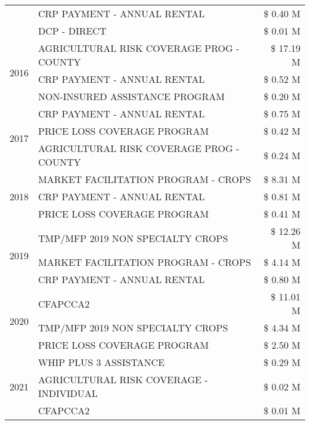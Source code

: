 \begin{tabular}{llr}
 & CRP PAYMENT - ANNUAL RENTAL & \$ 0.40 M \\
 & DCP - DIRECT & \$ 0.01 M \\
\cline{1-3}
\multirow[t]{3}{*}{2016} & AGRICULTURAL RISK COVERAGE PROG - COUNTY      & \$ 17.19 M \\
 & CRP PAYMENT - ANNUAL RENTAL                   & \$ 0.52 M \\
 & NON-INSURED ASSISTANCE PROGRAM                & \$ 0.20 M \\
\cline{1-3}
\multirow[t]{3}{*}{2017} & CRP PAYMENT - ANNUAL RENTAL & \$ 0.75 M \\
 & PRICE LOSS COVERAGE PROGRAM & \$ 0.42 M \\
 & AGRICULTURAL RISK COVERAGE PROG - COUNTY & \$ 0.24 M \\
\cline{1-3}
\multirow[t]{3}{*}{2018} & MARKET FACILITATION PROGRAM - CROPS & \$ 8.31 M \\
 & CRP PAYMENT - ANNUAL RENTAL & \$ 0.81 M \\
 & PRICE LOSS COVERAGE PROGRAM & \$ 0.41 M \\
\cline{1-3}
\multirow[t]{3}{*}{2019} & TMP/MFP 2019 NON SPECIALTY CROPS & \$ 12.26 M \\
 & MARKET FACILITATION PROGRAM - CROPS & \$ 4.14 M \\
 & CRP PAYMENT - ANNUAL RENTAL & \$ 0.80 M \\
\cline{1-3}
\multirow[t]{3}{*}{2020} & CFAPCCA2 & \$ 11.01 M \\
 & TMP/MFP 2019 NON SPECIALTY CROPS & \$ 4.34 M \\
 & PRICE LOSS COVERAGE PROGRAM & \$ 2.50 M \\
\cline{1-3}
\multirow[t]{3}{*}{2021} & WHIP PLUS 3 ASSISTANCE & \$ 0.29 M \\
 & AGRICULTURAL RISK COVERAGE - INDIVIDUAL & \$ 0.02 M \\
 & CFAPCCA2 & \$ 0.01 M \\
\cline{1-3}
\bottomrule
\end{tabular}
